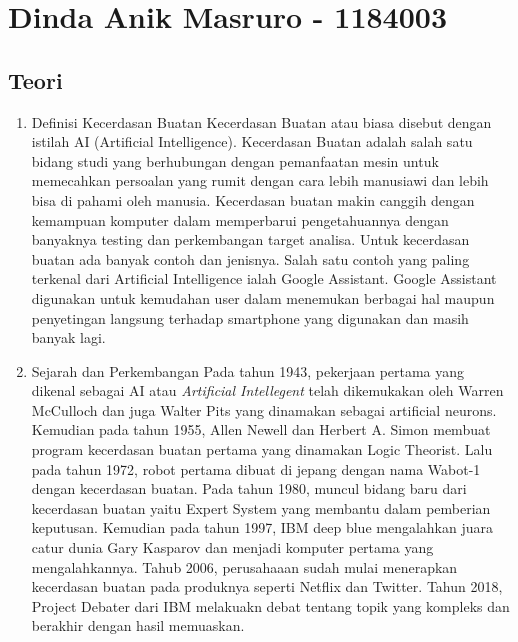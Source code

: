 \section{Dinda Anik Masruro - 1184003}
\subsection{Teori}
\begin{enumerate}

	\item Definisi Kecerdasan Buatan
	\hfill\break
	Kecerdasan Buatan atau biasa disebut dengan istilah AI (Artificial Intelligence). Kecerdasan Buatan adalah salah satu bidang studi yang berhubungan dengan pemanfaatan mesin untuk memecahkan persoalan yang rumit dengan cara lebih manusiawi dan lebih bisa di pahami oleh manusia. Kecerdasan buatan makin canggih dengan kemampuan komputer dalam memperbarui pengetahuannya dengan banyaknya testing dan perkembangan target analisa. Untuk kecerdasan buatan ada banyak contoh dan jenisnya. Salah satu contoh yang paling terkenal dari Artificial Intelligence ialah Google Assistant. Google Assistant digunakan untuk kemudahan user dalam menemukan berbagai hal maupun penyetingan langsung terhadap smartphone yang digunakan dan masih banyak lagi.

	\item Sejarah dan Perkembangan
	\hfill\break
    Pada tahun 1943, pekerjaan pertama yang dikenal sebagai AI atau \textit{Artificial Intellegent} telah dikemukakan oleh Warren McCulloch dan juga Walter Pits yang dinamakan sebagai artificial neurons. Kemudian pada tahun 1955, Allen Newell dan Herbert A. Simon membuat program kecerdasan buatan pertama yang dinamakan Logic Theorist. Lalu pada tahun 1972, robot pertama dibuat di jepang dengan nama Wabot-1 dengan kecerdasan buatan. Pada tahun 1980, muncul bidang baru dari kecerdasan buatan yaitu Expert System yang membantu dalam pemberian keputusan. Kemudian pada tahun 1997, IBM deep blue mengalahkan juara catur dunia Gary Kasparov dan menjadi komputer pertama yang mengalahkannya. Tahub 2006, perusahaaan sudah mulai menerapkan kecerdasan buatan pada produknya seperti Netflix dan Twitter. Tahun 2018, Project Debater dari IBM melakuakn debat tentang topik yang kompleks dan berakhir dengan hasil memuaskan.
	

\end{enumerate}
